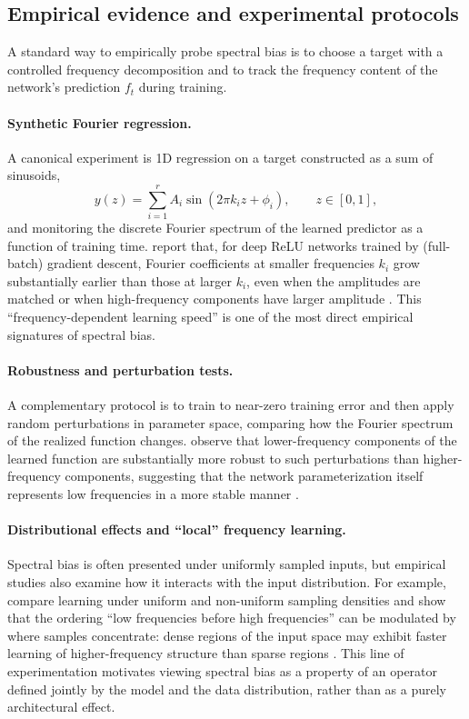 \subsection{Empirical evidence and experimental protocols}

A standard way to empirically probe spectral bias is to choose a target with a
controlled frequency decomposition and to track the frequency content of the
network's prediction $f_t$ during training.

\paragraph{Synthetic Fourier regression.}
A canonical experiment is 1D regression on a target constructed as a sum of
sinusoids,
\[
	y(z)=\sum_{i=1}^r A_i \sin(2\pi k_i z + \phi_i),
	\qquad z\in[0,1],
\]
and monitoring the discrete Fourier spectrum of the learned predictor as a
function of training time. \citet{rahaman2019spectralbiasneuralnetworks} report
that, for deep ReLU networks trained by (full-batch) gradient descent, Fourier
coefficients at smaller frequencies $k_i$ grow substantially earlier than those
at larger $k_i$, even when the amplitudes are matched or when high-frequency
components have larger amplitude \citep{rahaman2019spectralbiasneuralnetworks}.
This ``frequency-dependent learning speed'' is one of the most direct empirical
signatures of spectral bias.

\paragraph{Robustness and perturbation tests.}
A complementary protocol is to train to near-zero training error and then apply
random perturbations in parameter space, comparing how the Fourier spectrum of
the realized function changes. \citet{rahaman2019spectralbiasneuralnetworks}
observe that lower-frequency components of the learned function are
substantially more robust to such perturbations than higher-frequency
components, suggesting that the network parameterization itself represents low
frequencies in a more stable manner \citep{rahaman2019spectralbiasneuralnetworks}.

\paragraph{Distributional effects and ``local'' frequency learning.}
Spectral bias is often presented under uniformly sampled inputs, but empirical
studies also examine how it interacts with the input distribution. For example,
\citet{basri2020frequencybiasneuralnetworks} compare learning under uniform and
non-uniform sampling densities and show that the ordering ``low frequencies
before high frequencies'' can be modulated by where samples concentrate: dense
regions of the input space may exhibit faster learning of higher-frequency
structure than sparse regions \citep{basri2020frequencybiasneuralnetworks}.
This line of experimentation motivates viewing spectral bias as a property of an
operator defined jointly by the model and the data distribution, rather than as
a purely architectural effect.

